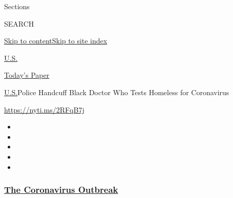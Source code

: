 Sections

SEARCH

\protect\hyperlink{site-content}{Skip to
content}\protect\hyperlink{site-index}{Skip to site index}

\href{https://www.nytimes3xbfgragh.onion/section/us}{U.S.}

\href{https://myaccount.nytimes3xbfgragh.onion/auth/login?response_type=cookie\&client_id=vi}{}

\href{https://www.nytimes3xbfgragh.onion/section/todayspaper}{Today's
Paper}

\href{/section/us}{U.S.}\textbar{}Police Handcuff Black Doctor Who Tests
Homeless for Coronavirus

\url{https://nyti.ms/2RFqB7j}

\begin{itemize}
\item
\item
\item
\item
\item
\end{itemize}

\hypertarget{the-coronavirus-outbreak}{%
\subsubsection{\texorpdfstring{\href{https://www.nytimes3xbfgragh.onion/news-event/coronavirus?name=styln-coronavirus-national\&region=TOP_BANNER\&block=storyline_menu_recirc\&action=click\&pgtype=Article\&impression_id=55c869f0-f4bf-11ea-9dac-9b804d637ca6\&variant=undefined}{The
Coronavirus
Outbreak}}{The Coronavirus Outbreak}}\label{the-coronavirus-outbreak}}

